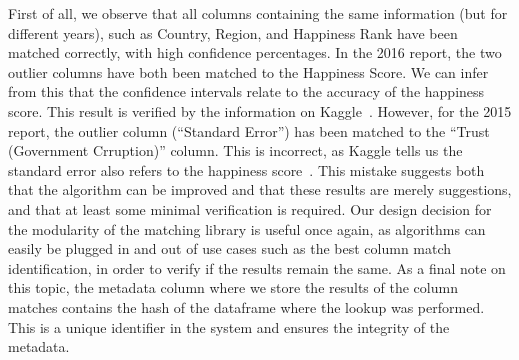 First of all, we observe that all columns containing the same information (but for different years), such as Country, Region,
and Happiness Rank have been matched correctly, with high confidence percentages.
In the 2016 report, the two outlier columns have both been matched to the Happiness Score.
We can infer from this that the confidence intervals relate to the accuracy of the happiness score.
This result is verified by the information on Kaggle~\cite{kaggleWorldHappinessReport}.
However, for the 2015 report, the outlier column (``Standard Error'') has been matched to the ``Trust (Government Crruption)''
column.
This is incorrect, as Kaggle tells us the standard error also refers to the happiness score~\cite{kaggleWorldHappinessReport}.
This mistake suggests both that the algorithm can be improved and that these results are merely suggestions, and that at least
some minimal verification is required.
Our design decision for the modularity of the matching library is useful once again, as algorithms can easily be plugged in
and out of use cases such as the best column match identification, in order to verify if the results remain the same.
As a final note on this topic, the metadata column where we store the results of the column matches contains the hash of
the dataframe where the lookup was performed.
This is a unique identifier in the system and ensures the integrity of the metadata.